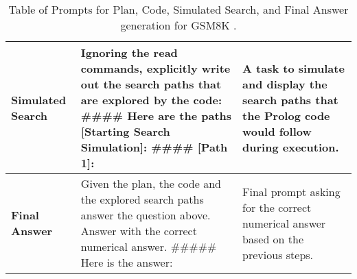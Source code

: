\begin{table*}[ht!]
{\begin{tabular}{@{}p{5cm}p{5cm}p{5cm}@{}}
        \midrule
        \textbf{Simulated Search} & 
        \begin{minipage}[t]{5cm}
        \vspace{0pt}
        Ignoring the read commands, explicitly write out the search paths that are explored by the code:
        \#\#\#\#
        Here are the paths [Starting Search Simulation]: 
        \#\#\#\# 
        [Path 1]:
        \end{minipage}
        & 
        \begin{minipage}[t]{5cm}
        \vspace{0pt}
        A task to simulate and display the search paths that the Prolog code would follow during execution.
        \end{minipage}
        \\
        \midrule
        \textbf{Final Answer} & 
        \begin{minipage}[t]{5cm}
        \vspace{0pt}
        Given the plan, the code and the explored search paths answer the question above. Answer with the correct numerical answer.
        \#\#\#\#\# Here is the answer:
        \end{minipage}
        & 
        \begin{minipage}[t]{5cm}
        \vspace{0pt}
        Final prompt asking for the correct numerical answer based on the previous steps.
        \end{minipage}
        \\
        \bottomrule
    \end{tabular}
    }
    \caption{Table of Prompts for Plan, Code, Simulated Search, and Final Answer generation for GSM8K \citep{DBLP:journals/corr/abs-2110-14168}.}
\end{table*}
